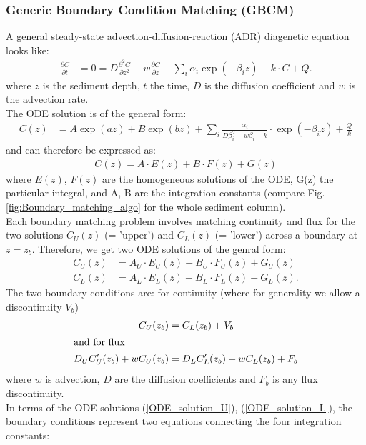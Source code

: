 \documentclass[gmd, manuscript]{copernicus}
\begin{document}
\subsubsection{Generic Boundary Condition Matching (GBCM)}\label{subsec:GBCM}
A general steady-state advection-diffusion-reaction (ADR) diagenetic equation looks like:
\begin{align} 
 \frac{\partial C}{\partial t} &= 0 = D\frac{\partial^2C }{\partial z^2} - w\frac{\partial C }{\partial z} - \sum_i \alpha_i \exp(-\beta_i z) - k\cdot C + Q.
\end{align}
where $z$ is the sediment depth, $t$ the time, $D$ is the diffusion coefficient and $w$ is the advection rate.\\
The ODE solution is of the general form:
\begin{align}
 C(z) &= A \exp(az) + B  \exp(bz) + \sum_i \frac{\alpha_i}{D \beta_i^2-w\beta_i-k}\cdot \exp(-\beta_i z) + \frac{Q}{k} \label{eq:ODE_general_solution}
\end{align}
and can therefore be expressed as:
\begin{align}
C(z) = A \cdot E(z) + B \cdot F(z) + G(z) 
\end{align}
where $E(z)$, $F (z)$ are the homogeneous solutions of the ODE, G(z) the particular integral, and A, B are the integration constants (compare Fig. \ref{fig:Boundary_matching_algo} for the whole sediment column).\\[1em]
Each boundary matching problem involves matching continuity and flux for the two solutions $C_U(z)$ (= 'upper') and $C_L(z)$ (= 'lower') across a boundary at $z = z_b$. Therefore, we get two ODE solutions of the genral form:
\begin{align}
C_U(z) &= A_U \cdot E_U(z) + B_U \cdot F_U(z) + G_U(z) \label{ODE_solution_U}\\
C_L(z) &= A_L \cdot E_L(z) + B_L \cdot F_L(z) + G_L(z) .\label{ODE_solution_L}
\end{align}
The two boundary conditions are: for continuity (where for generality we allow a discontinuity $V_b$) 
\begin{align}
  C_U(z_b) &= C_L(z_b) + V_b	\\
\intertext{and for flux}
 D_U C_U'(z_b) + wC_U(z_b) &=  D_LC_L'(z_b) + wC_L(z_b) + F_b
\end{align}
where $w$ is advection, $D$ are the diffusion coefficients and $F_b$ is any flux discontinuity.\\[1em]
In terms of the ODE solutions (\ref{ODE_solution_U}), (\ref{ODE_solution_L}), the boundary conditions represent two equations connecting the four integration constants:\\
\end{document}

